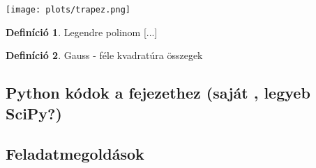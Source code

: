 \documentclass{article}
\theoremstyle{definition}
\newtheorem{definition}{Definíció}
\begin{document}
\texttt{[image: plots/trapez.png]}
\begin{definition}
Legendre polinom
[...]
\end{definition}
\begin{definition}
Gauss - féle kvadratúra összegek
\end{definition}

\subsection{Python kódok a fejezethez (saját , legyeb SciPy?)}

\subsection{Feladatmegoldások}
\end{document}
